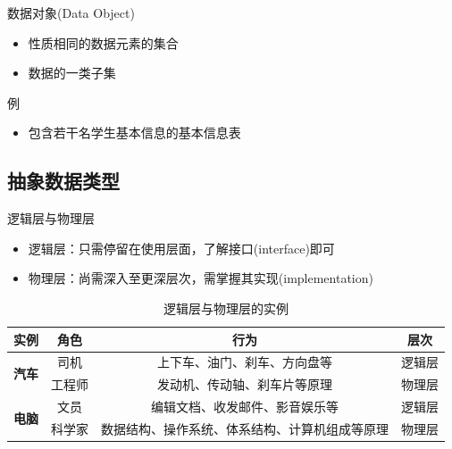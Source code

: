 \begin{frame}{\insertsubsectionhead}
    \begin{block}{数据对象(Data Object)}
        \begin{itemize}
            \item \alert{性质相同}\footnotemark{}的数据元素的集合
            \item 数据的一类子集
        \end{itemize}
    \end{block}
    \pause
    \begin{exampleblock}{例}
        \begin{itemize}
            \item 包含若干名学生基本信息的\alert{基本信息表}
        \end{itemize}
    \end{exampleblock}
\end{frame}

\subsection{抽象数据类型}

\begin{frame}{\insertsubsectionhead}
    \begin{block}{逻辑层与物理层}
        \begin{itemize}
            \item 逻辑层：只需停留在使用层面，了解\alert{接口(interface)}即可
            \item 物理层：尚需深入至更深层次，需掌握其\alert{实现(implementation)}
        \end{itemize}
    \end{block}
    \pause
    \begin{table}[h]
        \small
        \centering
        \caption{逻辑层与物理层的实例}
        \begin{tabular}{cccc}
            \toprule
            \textbf{实例}                  & \textbf{角色} & \textbf{行为}             & \textbf{层次} \\
            \midrule
            \multirow{2}{*}{\textbf{汽车}} & 司机          & 上下车、油门、刹车、方向盘等          & 逻辑层         \\
                                         & 工程师         & 发动机、传动轴、刹车片等原理          & 物理层         \\
            \midrule
            \multirow{2}{*}{\textbf{电脑}} & 文员          & 编辑文档、收发邮件、影音娱乐等         & 逻辑层         \\
                                         & 科学家         & 数据结构、操作系统、体系结构、计算机组成等原理 & 物理层         \\
            \bottomrule
        \end{tabular}
        \label{tab:log_phy}
    \end{table}
\end{frame}

